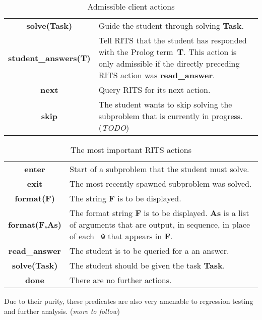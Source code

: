 \documentclass[a4paper,11pt]{article}
\begin{document}
\begin{table}[ht]
  \centering
  \begin{tabular}{cp{8cm}}
    \hline
    \textbf{solve(Task)} & Guide the student through solving \textbf{Task}.\\
    \textbf{student\_answers(T)} & Tell RITS that the student has responded with the Prolog term~\textbf{T}. This action is only admissible if the directly preceding RITS action was \textbf{read\_answer}.\\
    \textbf{next} & Query RITS for its next action. \\
    \textbf{skip} & The student wants to skip solving the subproblem that is
    currently in progress. (\textit{TODO})\\
    \hline
  \end{tabular}
\caption{Admissible client actions}
  \label{tab:useractions}
\end{table}

\begin{table}[ht]
  \centering
  \begin{tabular}{cp{8cm}}
    \hline
    \textbf{enter} & Start of a subproblem that the student must solve.\\
    \textbf{exit} & The most recently spawned subproblem was solved.\\
    \textbf{format(F)} & The string \textbf{F} is to be displayed.\\
    \textbf{format(F,As)} & The format string \textbf{F} is to be displayed. \textbf{As} is a list of arguments that are output, in sequence, in place of each \texttt{\~\ $\!\!\!$w} that appears in \textbf{F}.\\
    \textbf{read\_answer} & The student is to be queried for a an answer.\\
    \textbf{solve(Task)} & The student should be given the task \textbf{Task}.\\
    \textbf{done} & There are no further actions.\\
    \hline
  \end{tabular}
\caption{The most important RITS actions}
  \label{tab:ritsactions}
\end{table}


\vspace{0.7cm}

Due to their purity, these predicates are also very amenable to
regression testing and further analysis. (\textit{more to follow})

\vspace{0.7cm}
\end{document}
